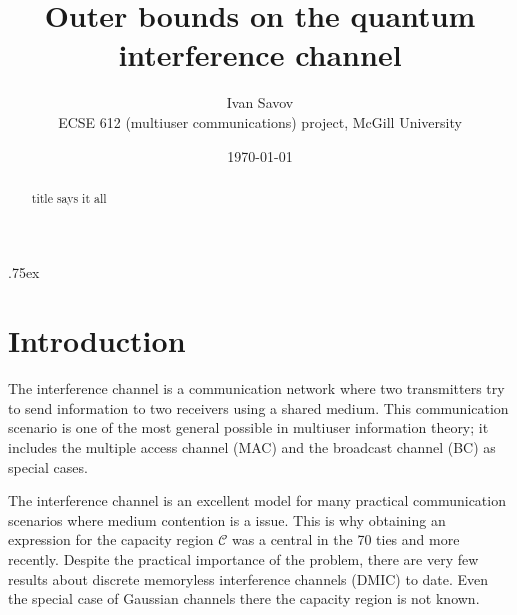 \documentclass[aps,11pt,twoside,letterpaper]{article}
\theoremstyle{plain}
\theoremstyle{definition}
\begin{document}
\title{{\Large Outer bounds on the quantum interference channel} }
\date{\today} 
\author{Ivan Savov \\
    ECSE 612 (multiuser communications) project, McGill University}




\parskip .75ex             %
\maketitle

\begin{abstract}
    title says it all
\end{abstract}


\section{Introduction}


    The interference channel is a communication network where two transmitters try to send
    information to two receivers using a shared medium. 
    This communication scenario is one of the most general possible in multiuser information
    theory; it includes the multiple access channel (MAC) and the broadcast channel (BC)
    as special cases.
    
    The interference channel is an excellent model for many practical communication scenarios
    where medium contention is a issue. This is why obtaining an expression for the capacity region
    $\mathcal{C}$ was a central in the 70 ties and more recently.
    Despite the practical importance of the problem, there are very few results about 
    discrete memoryless interference channels (DMIC) to date.
    Even the special case of Gaussian channels there the capacity region is not known.
    
\end{document}
